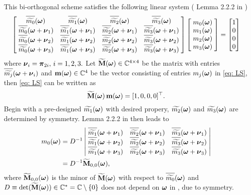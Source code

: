 This bi-orthogonal scheme satisfies the following linear system (
Lemma 2.2.2 in \cite{cohen1993compactly} )
\begin{align}\label{eq: LS}
\begin{bmatrix}
    \, \sbarm{0} &  \sbarm{1} &  \sbarm{2} & \sbarm{3}\; \\
    \;\sbarmn{0}{1} & \sbarmn{1}{1}  & \sbarmn{2}{1}  & \sbarmn{3}{1}\; \\
    \;\sbarmn{0}{2} & \sbarmn{1}{2}  & \sbarmn{2}{2}  & \sbarmn{3}{2}\; \\
    \;\sbarmn{0}{3} & \sbarmn{1}{3} & \sbarmn{2}{3} & \sbarmn{3}{3}\;
\end{bmatrix}
\begin{bmatrix}
\;\mo{0}\; \\
\;\mo{1}\; \\
\;\mo{2}\; \\
\;\mo{3}\; 
\end{bmatrix} 
=
\begin{bmatrix}
1\\
0\\
0\\
0
\end{bmatrix}
\end{align}
 where $\boldsymbol{\nu}_i = \boldsymbol{\pi}_{2i},\, i = 1,2,3.$ %
 Let $\widetilde{\mathbf{M}}(\boldsymbol{\omega})\in\mathbb{C}^{4\times 4}$ be the matrix with entries $\sbarmn{j}{i}$ and $\mathbf{m}(\boldsymbol{\omega})\in\mathbb{C}^4$ be the vector consisting of entries $m_j(\boldsymbol{\omega})$ in \eqref{eq: LS}, then \eqref{eq: LS} can be written as \[\widetilde{\mathbf{M}}(\boldsymbol{\omega})\, \mathbf{m} (\boldsymbol{\omega})= [1,0,0,0]^\top.\]
Begin with a pre-designed $\widetilde{m_{1}}(\boldsymbol{\omega})$ with desired propery, $\widetilde{m_{2}}(\boldsymbol{\omega})$ and $\widetilde{m_{3}}(\boldsymbol{\omega})$ are determined by symmetry. Lemma 2.2.2 in \cite{cohen1993compactly} then leads to
\begin{align}\label{eq: m0-sol}
m_0(\V{\omega}) &= D^{-1}%
\left|
\begin{matrix}
    \; \sbarmn{1}{1}  & \sbarmn{2}{1}  & \sbarmn{3}{1}\; \\
    \; \sbarmn{1}{2}  & \sbarmn{2}{2}  & \sbarmn{3}{2}\; \\
    \; \sbarmn{1}{3} & \sbarmn{2}{3} & \sbarmn{3}{3}\;
\end{matrix}
\right| \notag\\
&= D^{-1}\widetilde{\mathbf{M}}_{0,0}(\V{\omega}),
\end{align}
where $\widetilde{\mathbf{M}}_{0,0}(\boldsymbol{\omega})$ is the minor of $\widetilde{\mathbf{M}}(\boldsymbol{\omega})$ with respect to $\sbarm{0}$ and $ D \equiv \det(\widetilde{\mathbf{M}}(\boldsymbol{\omega}))\in \mathbb{C}^* = \mathbb{C}\setminus\{0\}$ does not depend on $\boldsymbol{\omega}$ in \cite{cohen1993compactly}, due to symmetry.

